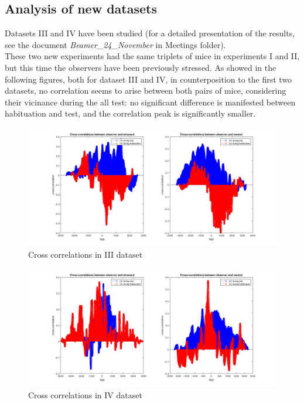 \documentclass[a4paper]{article}
\begin{document}
	
	\subsection{Analysis of new datasets}
	
	Datasets III and IV have been studied (for a detailed presentation of the results, see the document \textit{Beamer\_24\_November} in Meetings folder). \\
	These two new experiments had the same triplets of mice in experiments I and II, but this time the observers have been previously stressed.
	As showed in the following figures, both for dataset III and IV, in counterposition to the first two datasets, no correlation seems to arise between both pairs of mice, considering their vicinance during the all test: no significant difference is manifested between habituation and test, and the correlation peak is significantly smaller.
	
	
	
	\begin{figure}[H]
		\begin{center}
			\hspace*{-1cm}
			\includegraphics[scale=.36]{obs_stress_neut.jpg} 
		\end{center}  
	\caption{Cross correlations in III dataset}
	\end{figure}
	
	
	\begin{figure}[H]
		\begin{center}
			\hspace*{-1cm}
			\includegraphics[scale=.32]{obs_stress_neut4.jpg} 
		\end{center}  
		\caption{Cross correlations in IV dataset}
	\end{figure}
	
\end{document}
